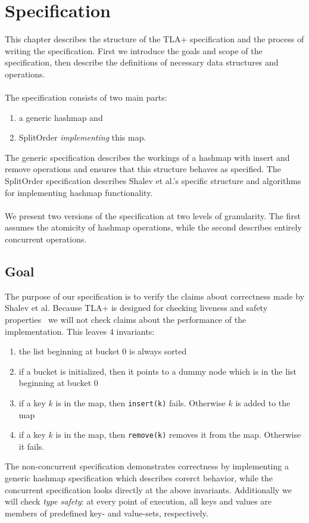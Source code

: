 \documentclass{uit-thesis}
\begin{document}
\chapter{Specification}\label{ch:specification}
This chapter describes the structure of the TLA+ specification and the process of writing the specification. First we introduce the goals and scope of the specification, then describe the definitions of necessary data structures and operations.
\\\\
The specification consists of two main parts:
\begin{enumerate}
    \item a generic hashmap and
    \item SplitOrder \textit{implementing} this map.
\end{enumerate}
The generic specification describes the workings of a hashmap with insert and remove operations and ensures that this structure behaves as specified. The SplitOrder specification describes Shalev et al.'s specific structure and algorithms for implementing hashmap functionality.
\\\\
We present two versions of the specification at two levels of granularity. The first assumes the atomicity of hashmap operations, while the second describes entirely concurrent operations.

\section{Goal}\label{sec:spec-goals}
The purpose of our specification is to verify the claims about correctness made by Shalev et al. Because TLA+ is designed for checking liveness and safety properties~\cite{Lund2019} we will not check claims about the performance of the implementation. This leaves 4 invariants:
\begin{enumerate}
    \item the list beginning at bucket 0 is always sorted
    \item if a bucket is initialized, then it points to a dummy node which is in the list beginning at bucket 0
    \item if a key $k$ is in the map, then \texttt{insert(k)} fails. Otherwise $k$ is added to the map
    \item if a key $k$ is in the map, then \texttt{remove(k)} removes it from the map. Otherwise it fails.
\end{enumerate}
The non-concurrent specification demonstrates correctness by implementing a generic hashmap specification which describes corerct behavior, while the concurrent specification looks directly at the above invariants.
Additionally we will check \textit{type safety}: at every point of execution, all keys and values are members of predefined key- and value-sets, respectively.
\end{document}
